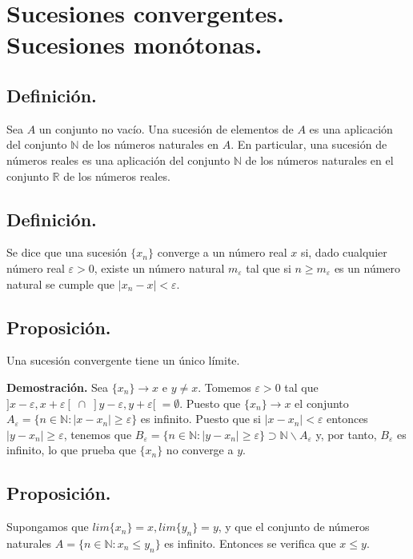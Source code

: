 \documentclass[10pt,a4paper]{article}
\begin{document}
	\newpage
	
	\section{Sucesiones convergentes. Sucesiones monótonas.}
	
	\subsection{Definición.}
	Sea $A$ un conjunto no vacío. Una sucesión de elementos de $A$ es una aplicación del conjunto $\mathbb{N}$ de los números naturales en $A$. En particular, una sucesión de números reales es una aplicación del conjunto $\mathbb{N}$ de los números naturales en el conjunto $\mathbb{R}$ de los números reales.
	
	\subsection{Definición.}
	Se dice que una sucesión $\{x_n\}$ converge a un número real $x$ si, dado cualquier número real $\varepsilon > 0$, existe un número natural $m_{\varepsilon}$ tal que si $n \geq m_{\varepsilon}$ es un número natural se cumple que $| x_n - x | < \varepsilon$.
	
	\subsection{Proposición.}
	Una sucesión convergente tiene un único límite.
	
	\textbf{Demostración.} Sea $\{x_n\} \rightarrow x$ e $y \neq x$. Tomemos $\varepsilon > 0$ tal que $]x- \varepsilon, x+\varepsilon[ \; \cap \; ]y-\varepsilon, y+\varepsilon[ \; = \emptyset$. Puesto que $\{x_n\} \rightarrow x$ el conjunto $A_\varepsilon = \{n \in \mathbb{N}:|x-x_n| \geq \varepsilon\}$ es infinito. Puesto que si $|x-x_n| < \varepsilon$ entonces $|y - x_n| \geq \varepsilon$, tenemos que $B_\varepsilon = \{n \in \mathbb{N}: |y - x_n| \geq \varepsilon\} \supset \mathbb{N} \backslash A_\varepsilon$ y, por tanto, $B_\varepsilon$ es infinito, lo que prueba que $\{x_n\}$ no converge a $y$.
	
	\subsection{Proposición.}
	
	Supongamos que $lim\{x_n\} = x, lim\{y_n\} = y$, y que el conjunto de números naturales $A = \{n \in \mathbb{N}: x_n \leq y_n\}$ es infinito. Entonces se verifica que $x \leq y$.
	
\end{document}
